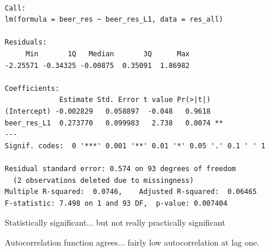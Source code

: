 \documentclass{beamer}\usepackage[]{graphicx}\usepackage[]{color}
\makeatletter
\newenvironment{kframe}{%
 \def\at@end@of@kframe{}%
 \ifinner\ifhmode%
  \def\at@end@of@kframe{\end{minipage}}%
  \begin{minipage}{\columnwidth}%
 \fi\fi%
 \def\FrameCommand##1{\hskip\@totalleftmargin \hskip-\fboxsep
 \colorbox{shadecolor}{##1}\hskip-\fboxsep
     \hskip-\linewidth \hskip-\@totalleftmargin \hskip\columnwidth}%
 \MakeFramed {\advance\hsize-\width
   \@totalleftmargin\z@ \linewidth\hsize
   \@setminipage}}%
 {\par\unskip\endMakeFramed%
 \at@end@of@kframe}
\newenvironment{knitrout}{}{} %
\makeatother
\begin{document}
\begin{darkframes}
\begin{frame}[fragile]
\begin{knitrout}
\begin{kframe}
\begin{verbatim}

Call:
lm(formula = beer_res ~ beer_res_L1, data = res_all)

Residuals:
     Min       1Q   Median       3Q      Max 
-2.25571 -0.34325 -0.00875  0.35091  1.86982 

Coefficients:
             Estimate Std. Error t value Pr(>|t|)   
(Intercept) -0.002829   0.058897  -0.048   0.9618   
beer_res_L1  0.273770   0.099983   2.738   0.0074 **
---
Signif. codes:  0 '***' 0.001 '**' 0.01 '*' 0.05 '.' 0.1 ' ' 1

Residual standard error: 0.574 on 93 degrees of freedom
  (2 observations deleted due to missingness)
Multiple R-squared:  0.0746,	Adjusted R-squared:  0.06465 
F-statistic: 7.498 on 1 and 93 DF,  p-value: 0.007404
\end{verbatim}
\end{kframe}
\end{knitrout}
Statistically significant... but not really practically significant
\end{frame}  

\begin{frame}[fragile]
\begin{knitrout}


\end{knitrout}
      Autocorrelation function agrees... fairly low autocorrelation at lag one.
\end{frame}
  \end{darkframes}
\end{document}
